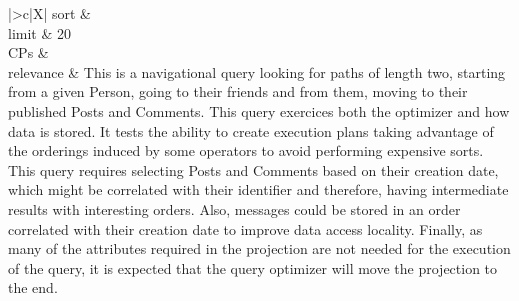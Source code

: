\begin{tabularx}{\queryCardWidth}{|>{\queryPropertyCell}c|X|}
%
	sort        &
        \innerCardVSpace \\ \hline
	limit & 20 \\ \hline
	CPs &
	 \\ \hline
    relevance &
        \small This is a navigational query looking for paths of length two, starting from a given Person, going to their friends and
from them, moving to their published Posts and Comments. This query exercices both the optimizer and how data is
stored. It tests the ability to create execution plans taking advantage of the orderings induced by some operators to
avoid performing expensive sorts. This query requires selecting Posts and Comments based on their creation date,
which might be correlated with their identifier and therefore, having intermediate results with interesting orders.
Also, messages could be stored in an order correlated with their creation date to improve data access locality. Finally,
as many of the attributes required in the projection are not needed for the execution of the query, it is expected that
the query optimizer will move the projection to the end.
 \\ \hline%
\end{tabularx}
\queryCardVSpace